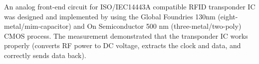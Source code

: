 An analog front-end circuit for ISO/IEC14443A compatible RFID transponder IC was designed and implemented by using the Global Foundries 130nm (eight-metal/mim-capacitor) and On Semiconductor 500 nm (three-metal/two-poly) CMOS process. The measurement demonstrated that the transponder IC works properly (converts RF power to DC voltage, extracts the clock and data, and correctly sends data back).